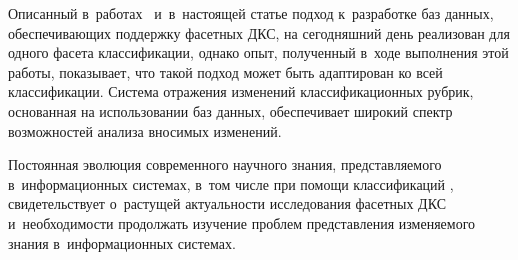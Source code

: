\begin{multicols}{2}
\vspace*{-2pt}

  Описанный в~работах~\cite{2-go, 3-go} и~в~настоящей статье подход 
к~разработке баз данных, обеспечивающих поддержку фасетных ДКС, на 
сегодняшний день реализован для одного фасета классификации, однако 
опыт, полученный в~ходе выполнения этой работы, показывает, что такой 
подход может быть адаптирован ко всей классификации. Сис\-те\-ма 
отражения изменений классификационных рубрик, основанная на 
использовании баз данных, обеспечивает широкий спектр возможностей 
анализа вносимых изменений.
  
  Постоянная эволюция современного \mbox{научного} знания, пред\-став\-ля\-емо\-го 
в~информационных сис\-те\-мах, в~том чис\-ле при помощи 
классификаций \cite{21-go, 22-go, 23-go, 24-go, 25-go, 26-go}, 
свидетельствует о~рас\-ту\-щей ак\-ту\-аль\-ности исследования фасетных ДКС 
и~не\-об\-хо\-ди\-мости продолжать изуче\-ние проб\-лем пред\-став\-ле\-ния 
изменяемого знания в~информационных сис\-темах.

\vspace*{-4pt}
  
{\small\frenchspacing
 {\baselineskip=10.75pt
 \begin{thebibliography}{99}

 \vspace*{-2pt}


\end{thebibliography}}}
\end{multicols}
